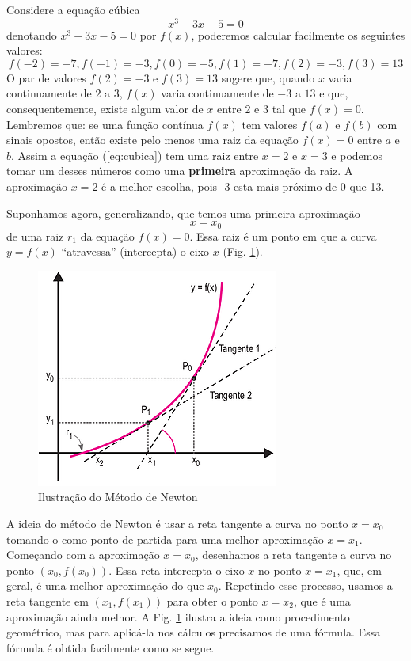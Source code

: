 \cleardoublepage\documentclass[../main.tex]{subfiles}
\begin{document}
Considere a equação cúbica 
\begin{equation}
    x^3 - 3x- 5 = 0\label{eq:cubica}
\end{equation}
 denotando $x^3 - 3x- 5 = 0$ por $f(x)$, poderemos calcular facilmente os seguintes valores: 
$$f(- 2) =-7, f(- 1)=-3, f(0) =- 5, f(1) =-7, f(2) =-3, f(3) =1 3$$ 
O par de valores $f(2) = - 3$ e $f(3) = 13$ sugere que, quando $x$ varia continuamente de $2$ a $3$, $f(x)$ varia continuamente de $-3$ a $13$ e que, consequentemente, existe algum valor de $x$ entre 2 e 3 tal que $f(x) = 0$. Lembremos que:  se uma função contínua $f(x)$ tem valores $f(a)$ e $f(b)$ com sinais opostos, então existe pelo menos uma raiz da equação $f(x) = 0$ entre $a$ e $b$. Assim a equação (\ref{eq:cubica}) tem uma raiz entre $x = 2$ e $x = 3$ e podemos tomar um desses números como uma \textbf{primeira} aproximação da raiz. A aproximação $x = 2$ é a melhor escolha, pois -3 esta mais próximo de 0 que 13. 

Suponhamos agora, generalizando, que temos uma primeira aproximação $$x = x_0$$ de uma raiz $r_1$ da equação $f(x ) =0$. Essa raiz é um ponto em que a curva $y = f(x )$ ``atravessa'' (intercepta) o eixo $x$ (Fig. \ref{fig:MetNewon}). 
\begin{figure}[H]
    \centering
    \includegraphics[scale=0.6]{fig_MetNewton/MetNewton.png}
    \caption{Ilustração do Método de Newton}
    \label{fig:MetNewon}
\end{figure}

A ideia do método de Newton é usar a reta tangente a curva no ponto \( x = x_0 \) tomando-o como 
ponto de partida para uma melhor aproximação \(x = x_1\).  Começando com a aproximação \( x = x_0 \), 
desenhamos a reta tangente a curva no ponto $(x_0,f(x_0))$. Essa reta intercepta o eixo \(x\) no ponto 
\(x = x_1\), que, em geral, é uma melhor aproximação do que $x_0$.  Repetindo esse processo, usamos 
a reta tangente em \((x_1, f(x_1 ))\) para obter o ponto \(x =x_2\), que é uma aproximação ainda melhor. 
A Fig. \ref{fig:MetNewon} ilustra a ideia como procedimento geométrico, mas para aplicá-la nos cálculos precisamos de uma fórmula. Essa fórmula é obtida facilmente como se segue. 
\end{document}
